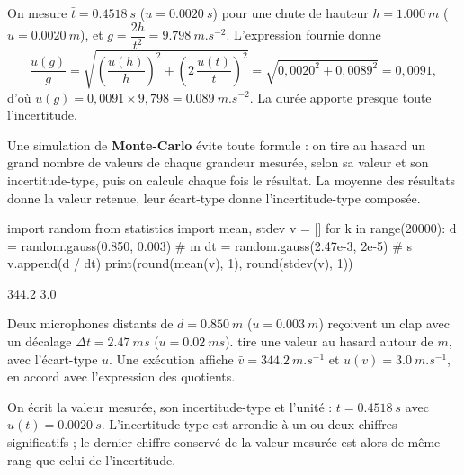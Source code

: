 \begin{savoirfaire}
On mesure $\bar t=\qty{0,4518}{s}$ ($u=\qty{0,0020}{s}$) pour une chute de hauteur $h=\qty{1,000}{m}$ ($u=\qty{0,0020}{m}$), et
$g=\dfrac{2h}{t^2}=\qty{9,798}{m.s^{-2}}$. L'expression fournie donne
\[\frac{u(g)}{g}=\sqrt{\left(\frac{u(h)}{h}\right)^2+\left(2\,\frac{u(t)}{t}\right)^2}=\sqrt{0{,}0020^2+0{,}0089^2}=0{,}0091,\]
d'où $u(g)=0{,}0091\times9{,}798=\qty{0,089}{m.s^{-2}}$. La durée apporte presque toute l'incertitude.
\end{savoirfaire}
\begin{propriete}
Une simulation de \textbf{Monte-Carlo} évite toute formule : on tire au hasard un grand nombre de valeurs de chaque grandeur
mesurée, selon sa valeur et son incertitude-type, puis on calcule chaque fois le résultat. La moyenne des résultats
donne la valeur retenue, leur écart-type donne l'incertitude-type composée.
\end{propriete}
\begin{codecote}[0.66]
\begin{pythoncol}
import random
from statistics import mean, stdev
v = []
for k in range(20000):
    d = random.gauss(0.850, 0.003)  # m
    dt = random.gauss(2.47e-3, 2e-5) # s
    v.append(d / dt)
print(round(mean(v), 1), round(stdev(v), 1))
\end{pythoncol}
\begin{consolecol}
344.2 3.0
\end{consolecol}
\cote
\fontsize{9.5}{12.5}\selectfont
{}\par\smallskip
Deux microphones distants de $d=\qty{0,850}{m}$ ($u=\qty{0,003}{m}$) reçoivent un clap avec un décalage $\Delta t=\qty{2,47}{ms}$
($u=\qty{0,02}{ms}$).  tire une valeur au hasard autour de $m$, avec l'écart-type $u$. Une exécution
affiche $\bar v=\qty{344,2}{m.s^{-1}}$ et $u(v)=\qty{3,0}{m.s^{-1}}$, en accord avec l'expression des quotients.
\end{codecote}
\begin{propriete}
On écrit la valeur mesurée, son incertitude-type et l'unité : $t=\qty{0,4518}{s}$ avec $u(t)=\qty{0,0020}{s}$. L'incertitude-type
est arrondie à un ou deux chiffres significatifs ; le dernier chiffre conservé de la valeur mesurée est alors de même
rang que celui de l'incertitude.
\end{propriete}
